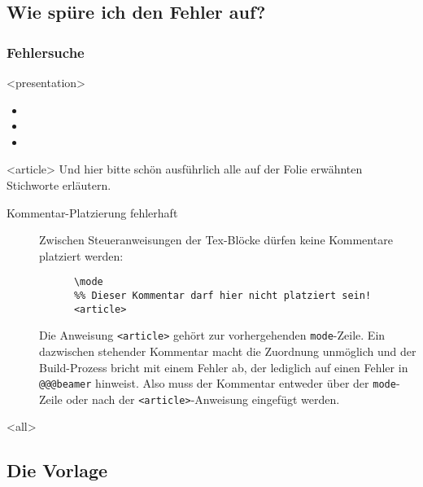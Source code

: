 \subsection{Wie spüre ich den Fehler auf?}

\begin{frame}[fragile]
\frametitle<presentation>{Fehlersuche}


\mode
<presentation>
\begin{itemize}
 \item 
 \item 
 \item 
\end{itemize}


\mode
<article>
Und hier bitte schön ausführlich alle auf der Folie erwähnten Stichworte erläutern.

\begin{description}
  \item [Kommentar-Platzierung fehlerhaft] Zwischen Steueranweisungen der Tex-Blöcke dürfen keine Kommentare platziert werden:
    \small
    \begin{block}{}
      \begin{verbatim}
      \mode
      %% Dieser Kommentar darf hier nicht platziert sein!
      <article>
      \end{verbatim}
    \end{block}
    \normalsize
    Die Anweisung \texttt{<article>} gehört zur vorhergehenden \texttt{mode}-Zeile. Ein dazwischen stehender Kommentar macht die Zuordnung unmöglich und der Build-Prozess bricht mit einem Fehler ab, der lediglich auf einen Fehler in \texttt{@@@beamer} hinweist. Also muss der Kommentar entweder über der \texttt{mode}-Zeile oder nach der \texttt{<article>}-Anweisung eingefügt werden.
\end{description}



\mode
<all>

\end{frame}
\newpage

\subsection{Die Vorlage}

